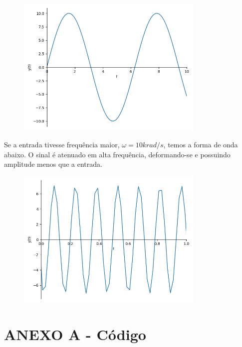 \documentclass[12pt]{scrartcl}
\begin{document}
\begin{figure}[htp!]
	\begin{center}
    \includegraphics[width=0.8\textwidth,trim=1 1 1 1,clip]{ex2_baixaf.png}
	\end{center}
\end{figure}

Se a entrada tivesse frequência maior, $\omega = 10 krad / s$,
temos a forma de onda abaixo. O sinal é atenuado em alta frequência, 
deformando-se e possuindo amplitude menos que a entrada.

\begin{figure}[htp!]
	\begin{center}
    \includegraphics[width=0.8\textwidth,trim=1 1 1 1,clip]{ex2_altaf.png}
	\end{center}
\end{figure}

\newpage

\section*{ANEXO A - Código}
\end{document}
